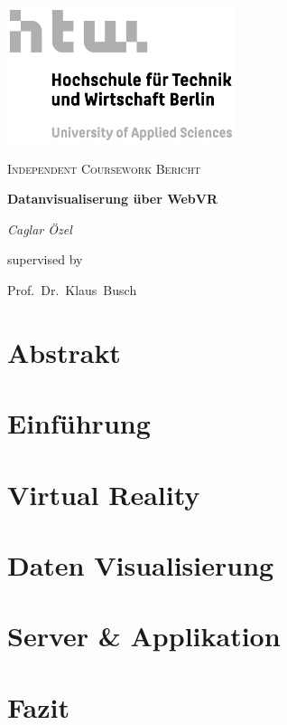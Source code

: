 \documentclass[a4paper, 12pt, oneside, onecolumn, final, openany]{report}
\begin{document}
    \begin{titlepage}
        \begin{center}
            \includegraphics[width=0.5\textwidth]{htw-logo.jpg}\par\vspace{1cm}
            \vspace{1cm}
            {\scshape\Large Independent Coursework Bericht\par}

            \vspace{1.5cm}
            {\Large\bfseries Datanvisualiserung über WebVR  }

            \vspace{2cm}
            {\Large\itshape Caglar Özel\par}

            \vfill

            supervised by\par
            Prof.\ Dr.\ Klaus\ Busch
            \vfill
        \end{center}
    \end{titlepage}

    \tableofcontents

    \newpage

    \chapter{Abstrakt}
    

    \chapter{Einführung}
    

    \chapter{Virtual Reality}
    
    
    \chapter{Daten Visualisierung}
    

    \chapter{Server \& Applikation}
    

    \chapter{Fazit}
    

    \newpage

    
    
\end{document}
